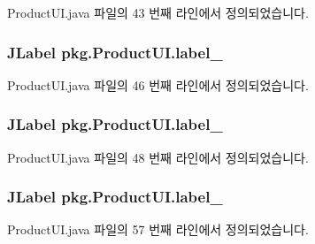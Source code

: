 Product\+U\+I.\+java 파일의 43 번째 라인에서 정의되었습니다.

\subsubsection[{\texorpdfstring{label\+\_\+3}{label_3}}]{\setlength{\rightskip}{0pt plus 5cm}J\+Label pkg.\+Product\+U\+I.\+label\+\_\hspace{0.3cm}{\ttfamily [private]}}\hypertarget{classpkg_1_1_product_u_i_a34869e36c8a05341ad152117c0abd8b5}{}\label{classpkg_1_1_product_u_i_a34869e36c8a05341ad152117c0abd8b5}


Product\+U\+I.\+java 파일의 46 번째 라인에서 정의되었습니다.

\subsubsection[{\texorpdfstring{label\+\_\+4}{label_4}}]{\setlength{\rightskip}{0pt plus 5cm}J\+Label pkg.\+Product\+U\+I.\+label\+\_\hspace{0.3cm}{\ttfamily [private]}}\hypertarget{classpkg_1_1_product_u_i_accc652eee841b5191b1531a9b6eb8c9e}{}\label{classpkg_1_1_product_u_i_accc652eee841b5191b1531a9b6eb8c9e}


Product\+U\+I.\+java 파일의 48 번째 라인에서 정의되었습니다.

\subsubsection[{\texorpdfstring{label\+\_\+5}{label_5}}]{\setlength{\rightskip}{0pt plus 5cm}J\+Label pkg.\+Product\+U\+I.\+label\+\_\hspace{0.3cm}{\ttfamily [private]}}\hypertarget{classpkg_1_1_product_u_i_a15bb6a2e073f1c9db2fd7289afd4dd5e}{}\label{classpkg_1_1_product_u_i_a15bb6a2e073f1c9db2fd7289afd4dd5e}


Product\+U\+I.\+java 파일의 57 번째 라인에서 정의되었습니다.

